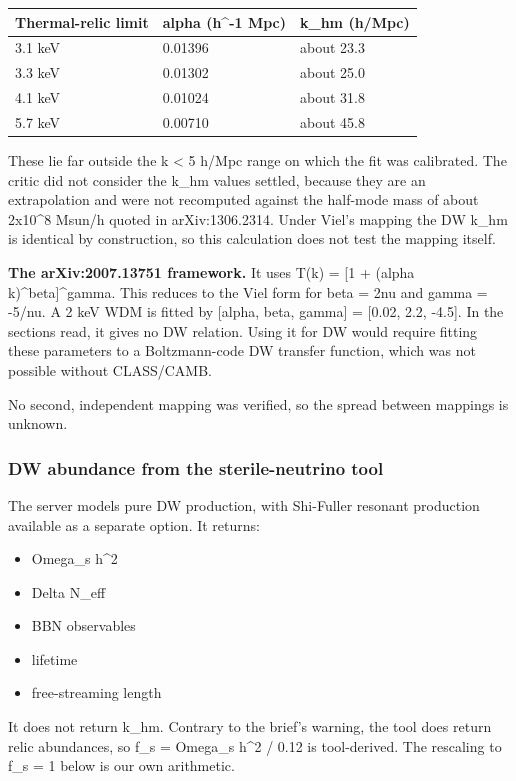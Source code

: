 \documentclass[11pt,a4paper]{article}
\begin{document}
\begin{longtable}{@{}p{}p{}p{}@{}}
\toprule
\textbf{Thermal-relic limit} & \textbf{alpha (h\textasciicircum{}-1 Mpc)} & \textbf{k\_hm (h/Mpc)} \\ \midrule \endhead
3.1 keV & 0.01396 & about 23.3 \\
3.3 keV & 0.01302 & about 25.0 \\
4.1 keV & 0.01024 & about 31.8 \\
5.7 keV & 0.00710 & about 45.8 \\
\bottomrule\end{longtable}
These lie far outside the k \textless{} 5 h/Mpc range on which the fit was calibrated. The critic did not consider the k\_hm values settled, because they are an extrapolation and were not recomputed against the half-mode mass of about 2x10\textasciicircum{}8 Msun/h quoted in arXiv:1306.2314. Under Viel's mapping the DW k\_hm is identical by construction, so this calculation does not test the mapping itself.

\textbf{The arXiv:2007.13751 framework.} It uses T(k) = [1 + (alpha k)\textasciicircum{}beta]\textasciicircum{}gamma. This reduces to the Viel form for beta = 2nu and gamma = -5/nu. A 2 keV WDM is fitted by [alpha, beta, gamma] = [0.02, 2.2, -4.5]. In the sections read, it gives no DW relation. Using it for DW would require fitting these parameters to a Boltzmann-code DW transfer function, which was not possible without CLASS/CAMB.

No second, independent mapping was verified, so the spread between mappings is unknown.

\subsubsection{DW abundance from the sterile-neutrino tool}
The server models pure DW production, with Shi-Fuller resonant production available as a separate option. It returns:

\begin{itemize}
  \item Omega\_s h\textasciicircum{}2
  \item Delta N\_eff
  \item BBN observables
  \item lifetime
  \item free-streaming length
\end{itemize}
It does not return k\_hm. Contrary to the brief's warning, the tool does return relic abundances, so f\_s = Omega\_s h\textasciicircum{}2 / 0.12 is tool-derived. The rescaling to f\_s = 1 below is our own arithmetic.
\end{document}
